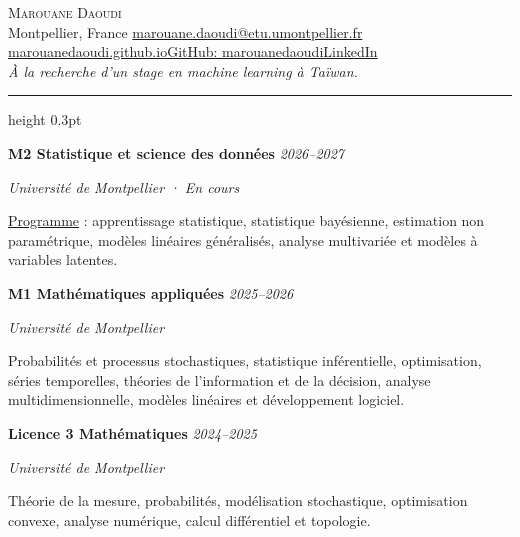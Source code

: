 \documentclass[a4paper,11pt]{article}
\newcommand{\cvsection}[1]{\par\vspace{7pt}{\fontsize{12}{14}\selectfont\scshape #1}\par\vspace{2pt}\hrule height 0.3pt\vspace{4pt}}
\newcommand{\cventry}[3]{\par\vspace{3pt}\textbf{#1} #3\hfill{\fontsize{9.8}{11.5}\selectfont\textit{#2}}\par}
\newenvironment{cvitems}{\begin{list}{\textbullet}{\setlength{\leftmargin}{1.1em}\setlength{\labelsep}{0.35em}\setlength{\itemsep}{1pt}\setlength{\topsep}{1pt}\setlength{\parsep}{0pt}\setlength{\partopsep}{0pt}}}{\end{list}}
\begin{document}
\fontsize{11}{13}\selectfont
\raggedright
\begin{center}
{\fontsize{22}{25}\selectfont\scshape Marouane Daoudi}\\[4pt]
{\fontsize{9.7}{12}\selectfont Montpellier, France \enspace\textperiodcentered\enspace \href{mailto:marouane.daoudi@etu.umontpellier.fr}{marouane.daoudi@etu.umontpellier.fr}}\\[2pt]
{\fontsize{9.7}{12}\selectfont \href{https://marouanedaoudi.github.io/}{marouanedaoudi.github.io}\enspace\textperiodcentered\enspace\href{https://github.com/marouanedaoudi}{GitHub: marouanedaoudi}\enspace\textperiodcentered\enspace\href{https://fr.linkedin.com/in/daoudimarouane}{LinkedIn}}\\[5pt]
{\fontsize{10}{12}\selectfont\textit{À la recherche d'un stage en machine learning à Taïwan.}}
\end{center}
\vspace{-5pt}
\cvsection{Formation}
\cventry{M2 Statistique et science des données}{2026--2027}{}
\textit{Université de Montpellier · En cours}\\[1pt]
\begin{cvitems}
\item \href{https://formations.umontpellier.fr/fr/formations/master-XB/master-mathematiques-ME157/statistique-et-science-des-donnees-ssd-KKIDCY8N/m2-statistique-et-science-des-donnees-ssd-biostats-KKIDDT0T.html}{Programme} : apprentissage statistique, statistique bayésienne, estimation non paramétrique, modèles linéaires généralisés, analyse multivariée et modèles à variables latentes.
\end{cvitems}
\cventry{M1 Mathématiques appliquées}{2025--2026}{}
\textit{Université de Montpellier}\\[1pt]
\begin{cvitems}
\item Probabilités et processus stochastiques, statistique inférentielle, optimisation, séries temporelles, théories de l'information et de la décision, analyse multidimensionnelle, modèles linéaires et développement logiciel.
\end{cvitems}
\cventry{Licence 3 Mathématiques}{2024--2025}{}
\textit{Université de Montpellier}\\[1pt]
\begin{cvitems}
\item Théorie de la mesure, probabilités, modélisation stochastique, optimisation convexe, analyse numérique, calcul différentiel et topologie.
\end{cvitems}
\end{document}

